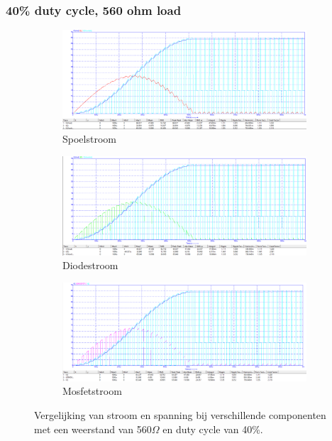 \subsubsection{40\% duty cycle, 560 ohm load}
\begin{figure}[h!]
    \centering
    \begin{subfigure}[b]{0.3\linewidth}
        \centering
        \includegraphics[width=\linewidth]{img/hfd1/hfd1-40pduty-560-INDUCTOR.png}
        \caption{Spoelstroom}
        \label{fig:inductor40}
    \end{subfigure}
    \hfill
    \begin{subfigure}[b]{0.3\linewidth}
        \centering
        \includegraphics[width=\linewidth]{img/hfd1/hfd1-40pduty-560-DIODE.png}
        \caption{Diodestroom}
        \label{fig:diode40}
    \end{subfigure}
    \hfill
    \begin{subfigure}[b]{0.3\linewidth}
        \centering
        \includegraphics[width=\linewidth]{img/hfd1/hfd1-40pduty-560-MOSFET.png}
        \caption{Mosfetstroom}
        \label{fig:mosfet40}
    \end{subfigure}
    
    \caption{Vergelijking van stroom en spanning bij verschillende componenten met een weerstand van 560\(\Omega\) en duty cycle van 40\%.}
    \label{fig:componenten40}
\end{figure}




